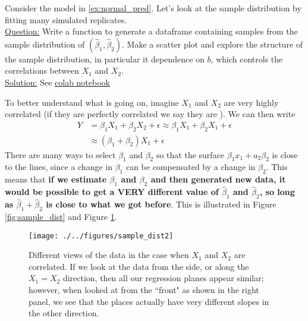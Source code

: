 \begin{example}

Consider the model in \ref{ex:normal_pred}. Let's look at the sample distribution by fitting many simulated replicates. \\

\noindent
\underline{Question:} Write a function to generate a dataframe containing samples from the sample distribution of $(\hat{\beta}_1,\hat{\beta}_2)$. Make a scatter plot and explore the structure of the sample distribution, in particular it dependence on $b$, which controls the correlations between $X_1$ and $X_2$. \\


\noindent
\underline{Solution:} 
See \href{https://colab.research.google.com/drive/1oIRgP_7-c5DGV1D2iz5nj406mZfJxUIG?usp=sharing}{colab notebook}

\end{example}

To better understand what is going on, imagine $X_1$ and $X_2$ are very highly correlated (if they are perfectly correlated we say they are ). We can then write 
\begin{align*}
Y &= \beta_1X_1 + \beta_2X_2 + \epsilon  \approx \beta_1X_1 + \beta_2X_1 + \epsilon\\
 &\approx (\beta_1+\beta_2)X_1 + \epsilon
\end{align*}
There are many ways to select $\beta_1$ and $\beta_2$ so that the surface $\beta_1x_1+a_2\beta_2$ is close to the lines, since a change in $\beta_1$ can be compensated by a change in $\beta_2$. This means that {\bf if we estimate $\beta_1$ and $\beta_2$ and then generated new data, it would be possible to get a VERY different value of $\hat{\beta}_1$ and $\hat{\beta}_2$, so long as $\hat{\beta}_1 + \hat{\beta}_2$ is close to what we got before}. This is illustrated in Figure \ref{fig:sample_dist} and Figure \ref{fig:sample_dist2}. 

\begin{figure}[h]
    \centering
    \texttt{[image: ./../figures/sample\_dist2]}
    \caption{Different views of the data in the case when $X_1$ and $X_2$ are correlated. If we look at the data from the side, or along the $X_1=X_2$ direction, then all our regression planes appear similar; however, when looked at from the ``front" as shown in the right panel, we see that the places actually have very different slopes in the other direction.  }
    \label{fig:sample_dist2}
\end{figure}





